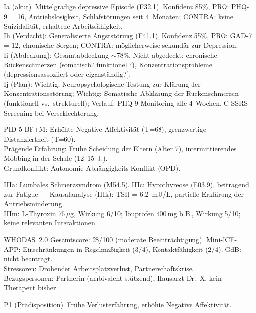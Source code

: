 \documentclass[11pt,a4paper]{article}
\begin{document}
\begin{description}[style=nextline, leftmargin=1.5cm, font=\bfseries\small]
\item[Achse~I (Psychische Profile)]
Ia (akut): Mittelgradige depressive Episode (F32.1), Konfidenz 85\%, PRO: PHQ-9 = 16, Antriebslosigkeit, Schlafst\"orungen seit 4~Monaten; CONTRA: keine Suizidalit\"at, erhaltene Arbeitsf\"ahigkeit. \\
Ih (Verdacht): Generalisierte Angstst\"orung (F41.1), Konfidenz 55\%, PRO: GAD-7 = 12, chronische Sorgen; CONTRA: m\"oglicherweise sekund\"ar zur Depression. \\
Ii (Abdeckung): Gesamtabdeckung $\sim$78\%. Nicht abgedeckt: chronische R\"uckenschmerzen (somatisch? funktionell?), Konzentrationsprobleme (depressionsassoziiert oder eigenst\"andig?). \\
Ij (Plan): Wichtig: Neuropsychologische Testung zur Kl\"arung der Konzentrationsst\"orung; Wichtig: Somatische Abkl\"arung der R\"uckenschmerzen (funktionell vs.\ strukturell); Verlauf: PHQ-9-Monitoring alle 4~Wochen, C-SSRS-Screening bei Verschlechterung.
\item[Achse~II (Biographie)]
PID-5-BF+M: Erh\"ohte Negative Affektivit\"at (T=68), grenzwertige Distanziertheit (T=60). \\
Pr\"agende Erfahrung: Fr\"uhe Scheidung der Eltern (Alter 7), intermittierendes Mobbing in der Schule (12--15~J.). \\
Grundkonflikt: Autonomie-Abh\"angigkeits-Konflikt (OPD).
\item[Achse~III (Med. Synopse)]
IIIa: Lumbales Schmerzsyndrom (M54.5). IIIc: Hypothyreose (E03.9), beitragend zur Fatigue --- Kausalanalyse (IIIk): TSH = 6.2~mU/L, partielle Erkl\"arung der Antriebsminderung. \\
IIIm: L-Thyroxin 75\,$\mu$g, Wirkung 6/10; Ibuprofen 400\,mg b.B., Wirkung 5/10; keine relevanten Interaktionen.
\item[Achse~IV (Umwelt \& Funktion)]
WHODAS~2.0 Gesamtscore: 28/100 (moderate Beeintr\"achtigung). Mini-ICF-APP: Einschr\"ankungen in Regelm\"a\ss{}igkeit (3/4), Kontaktf\"ahigkeit (2/4). GdB: nicht beantragt. \\
Stressoren: Drohender Arbeitsplatzverlust, Partnerschaftskrise. \\
Bezugspersonen: Partnerin (ambivalent st\"utzend), Hausarzt Dr.~X, kein Therapeut bisher.
\item[Achse~V (Bedingungsmodell)]
P1 (Pr\"adisposition): Fr\"uhe Verlusterfahrung, erh\"ohte Negative Affektivit\"at. \\

\end{description}
\end{document}
